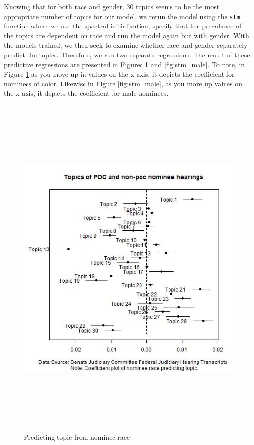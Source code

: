 \documentclass [12pt]{article}
\begin{document}
Knowing that for both race and gender, 30 topics seems to be the most appropriate number of topics for our model, we rerun the model using the \verb|stm| function where we use the spectral initialization, specify that the prevalance of the topics are dependent on race and run the model again but with gender. With the models trained, we then seek to examine whether race and gender separately predict the topics. Therefore, we run two separate regressions. The result of these predictive regressions are presented in Figures \ref{fig:stm_poc} and \ref{fig:stm_male}. To note, in Figure \ref{fig:stm_poc} as you move up in values on the x-axis, it depicts the coefficient for nominees of color. Likewise in Figure \ref{fig:stm_male}, as you move up values on the x-axis, it depicts the coefficient for male nominees. 

\begin{figure}[H]
    \centering
    \includegraphics[height = 175mm, width = 175mm]{../tables_figures/stm_poc_predict.jpg}
    \caption{Predicting topic from nominee race}
    \label{fig:stm_poc}
\end{figure}
\end{document}
